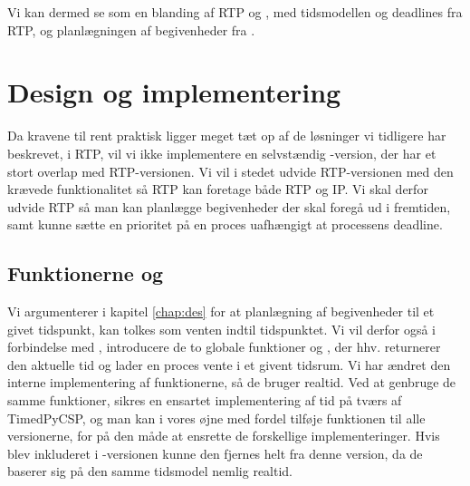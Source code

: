 Vi kan dermed se \is som en blanding af RTP og \des, med tidsmodellen og deadlines fra RTP, og planlægningen af begivenheder fra \des. 



\section{Design og implementering} 

Da kravene til \is rent praktisk ligger meget tæt op af de løsninger vi tidligere har beskrevet, i RTP, vil vi ikke implementere en selvstændig \ip-version, der har et stort overlap med RTP-versionen. Vi vil i stedet udvide RTP-versionen med den krævede funktionalitet så RTP kan foretage både RTP og IP.
Vi skal derfor udvide RTP så man kan planlægge begivenheder der skal foregå ud i fremtiden, samt kunne sætte en prioritet på en proces uafhængigt at processens deadline. 


\subsection{Funktionerne  og }

Vi argumenterer i kapitel \ref{chap:des} for at planlægning af begivenheder til et givet tidspunkt, kan tolkes som venten indtil tidspunktet. Vi vil derfor også i forbindelse med \ip, introducere de to globale funktioner  og , der hhv. returnerer den aktuelle tid og lader en proces vente i et givent tidsrum. Vi har ændret den interne implementering af funktionerne, så de bruger realtid. Ved at genbruge de samme funktioner, sikres en ensartet implementering af tid på tværs af TimedPyCSP, og man kan i vores øjne med fordel tilføje funktionen  til alle \pycsp versionerne, for på den måde at ensrette de forskellige implementeringer. Hvis  blev inkluderet i -versionen kunne den fjernes helt fra denne version, da de baserer sig på den samme tidsmodel nemlig realtid.

